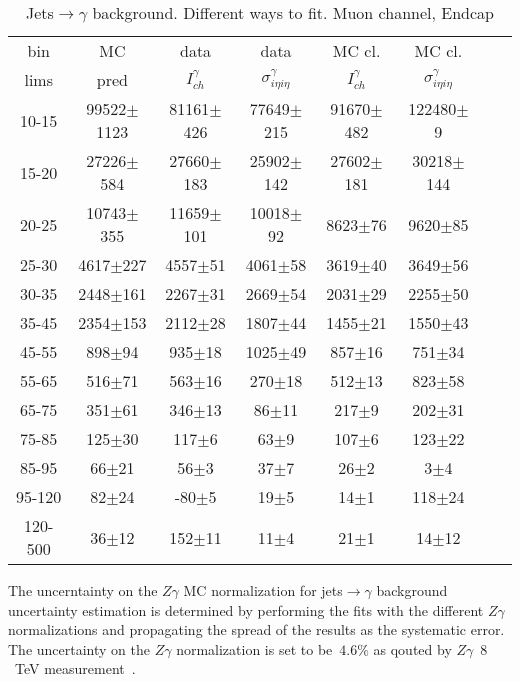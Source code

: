 \begin{table}[h]
  \tiny
  \begin{center}
  \caption{Jets$\rightarrow\gamma$ background. Different ways to fit. Muon channel, Endcap}
  \begin{tabular}{|c|c|c|c|c|c|c|c|}
    bin &  MC   & data  & data  & MC cl. & MC cl.\\ 
    lims & pred & $I_{ch}^{\gamma}$ & $\sigma_{i\eta i\eta}^\gamma$  & $I_{ch}^{\gamma}$  & $\sigma_{i\eta i\eta}^\gamma$  \\ \hline
10-15 & 99522$\pm$1123 & 81161$\pm$426 & 77649$\pm$215 & 91670$\pm$482 & 122480$\pm$9   \\ \hline
15-20 & 27226$\pm$584 & 27660$\pm$183 & 25902$\pm$142 & 27602$\pm$181 & 30218$\pm$144   \\ \hline
20-25 & 10743$\pm$355 & 11659$\pm$101 & 10018$\pm$92 & 8623$\pm$76 & 9620$\pm$85   \\ \hline
25-30 & 4617$\pm$227 & 4557$\pm$51 & 4061$\pm$58 & 3619$\pm$40 & 3649$\pm$56   \\ \hline
30-35 & 2448$\pm$161 & 2267$\pm$31 & 2669$\pm$54 & 2031$\pm$29 & 2255$\pm$50   \\ \hline
35-45 & 2354$\pm$153 & 2112$\pm$28 & 1807$\pm$44 & 1455$\pm$21 & 1550$\pm$43   \\ \hline
45-55 & 898$\pm$94 & 935$\pm$18 & 1025$\pm$49 & 857$\pm$16 & 751$\pm$34   \\ \hline
55-65 & 516$\pm$71 & 563$\pm$16 & 270$\pm$18 & 512$\pm$13 & 823$\pm$58   \\ \hline
65-75 & 351$\pm$61 & 346$\pm$13 & 86$\pm$11 & 217$\pm$9 & 202$\pm$31   \\ \hline
75-85 & 125$\pm$30 & 117$\pm$6 & 63$\pm$9 & 107$\pm$6 & 123$\pm$22   \\ \hline
85-95 & 66$\pm$21 & 56$\pm$3 & 37$\pm$7 & 26$\pm$2 & 3$\pm$4   \\ \hline
95-120 & 82$\pm$24 & -80$\pm$5 & 19$\pm$5 & 14$\pm$1 & 118$\pm$24   \\ \hline
120-500 & 36$\pm$12 & 152$\pm$11 & 11$\pm$4 & 21$\pm$1 & 14$\pm$12   \\ \hline

  \end{tabular}
  \label{tab:Jets_to_gamma_diff_ways_to_fit_1}
  \end{center}
\end{table}


The uncerntainty on the $Z\gamma$ MC normalization for jets$\rightarrow\gamma$ background uncertainty estimation is determined by performing the fits with the different $Z\gamma$ normalizations and propagating the spread of the results as the systematic error. The uncertainty on the $Z\gamma$ normalization is set to be~$4.6\%$ as qouted by $Z\gamma$~$8$~TeV measurement~\cite{ref_Zg8TeV}.

